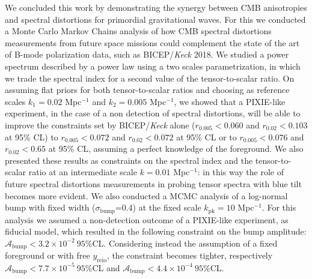 We concluded this work by demonstrating the synergy between CMB anisotropies and spectral distortions for primordial gravitational waves. For this we conducted a Monte Carlo Markov Chains analysis of how CMB spectral distortions measurements from future space missions could complement the state of the art of B-mode polarization data, such as BICEP/\emph{Keck} 2018. We studied a power spectrum described by a power law using a two scales parametrization, in which we trade the spectral index for a second value of the tensor-to-scalar ratio. On assuming flat priors for both tensor-to-scalar ratios and choosing as reference scales $k_1=0.02$ Mpc$^{-1}$ and $k_2=0.005$ Mpc$^{-1}$, we showed that a PIXIE-like experiment, in the case of a non detection of spectral distortions, will be able to improve the constraints set by BICEP/\emph{Keck} alone ($r_{0.005}<0.060$ and $r_{0.02}<0.103$ at 95\% CL) to $r_{0.005}<0.072$ and $r_{0.02}<0.072$ at 95\% CL or to $r_{0.005}<0.076$ and $r_{0.02}<0.65$ at 95\% CL, assuming a perfect knowledge of the foreground. We also presented these results as constraints on the spectral index and the tensor-to-scalar ratio at an intermediate scale $k=0.01$ Mpc$^{-1}$: in this way the role of future spectral distortions measurements in probing tensor spectra with blue tilt becomes more evident. We also conducted a MCMC analysis of a log-normal bump with fixed width ($\sigma_\text{bump}$=0.4) at the fixed scale $k_\text{pk}=10$ Mpc$^{-1}$. For this analysis we assumed a non-detection outcome of a PIXIE-like experiment, as fiducial model, which resulted in the following constraint on the bump amplitude: $\mathcal A_\text{bump}<3.2\times10^{-2}\ 95\%$CL. Considering instead the assumption of a fixed foreground or with free $y_\text{reio}$, the constraint becomes tighter, respectively $\mathcal A_\text{bump}<7.7\times10^{-5}\ 95\%$CL and $\mathcal A_\text{bump}<4.4\times10^{-4}\ 95\%$CL.

